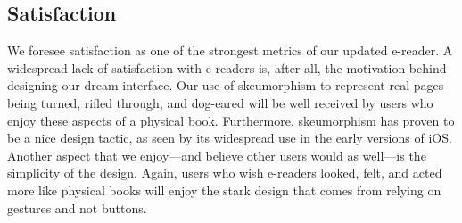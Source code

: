 \documentclass[11pt, oneside]{article}   	%
\begin{document}
\subsection {Satisfaction}
We foresee satisfaction as one of the strongest metrics of our updated e-reader. A widespread lack of satisfaction with e-readers is, after all, the motivation behind designing our dream interface. Our use of skeumorphism to represent real pages being turned, rifled through, and dog-eared will be well received by users who enjoy these aspects of a physical book. Furthermore, skeumorphism has proven to be a nice design tactic, as seen by its widespread use in the early versions of iOS. Another aspect that we enjoy---and believe other users would as well---is the simplicity of the design. Again, users who wish e-readers looked, felt, and acted more like physical books will enjoy the stark design that comes from relying on gestures and not buttons.
\end{document}
